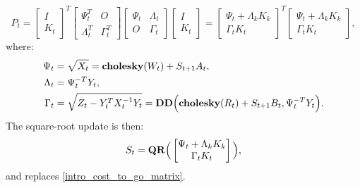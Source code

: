 \begin{equation}
	P_t = \begin{bmatrix} I \\ K_t \end{bmatrix}^T 
		   \begin{bmatrix} \Psi_t^T & O \\ \Lambda_t^T & \Gamma_t^T \end{bmatrix}
		   \begin{bmatrix} \Psi_t & \Lambda_t \\ O & \Gamma_t \end{bmatrix}
		   \begin{bmatrix} I \\ K_t \end{bmatrix}
		= \begin{bmatrix} \Psi_t + \Lambda_k K_k \\ \Gamma_t K_t \end{bmatrix}^T 
		   \begin{bmatrix} \Psi_t + \Lambda_k K_k \\ \Gamma_t K_t \end{bmatrix},
\end{equation}
where:
\begin{align}
	\Psi_t & = \sqrt{X_t} = \mbox{\textbf{cholesky}}(W_t) + S_{t+1} A_t, \\
	\Lambda_t &= \Psi_t^{-T} Y_t, \\
	\Gamma_t &= \sqrt{Z_t - Y_t^T X_t^{-1} Y_t} =  \mbox{\textbf{DD}}\Big(\mbox{\textbf{cholesky}}(R_t) + S_{t+1} B_t, \Psi_t^{-T} Y_t \Big).
\end{align}
The square-root update is then:
\begin{equation}
	S_t = \mbox{\textbf{QR}}\Big(\begin{bmatrix} \Psi_t + \Lambda_k K_k \\ \Gamma_t K_t \end{bmatrix} \Big),
\end{equation}
and replaces \eqref{intro_cost_to_go_matrix}.


